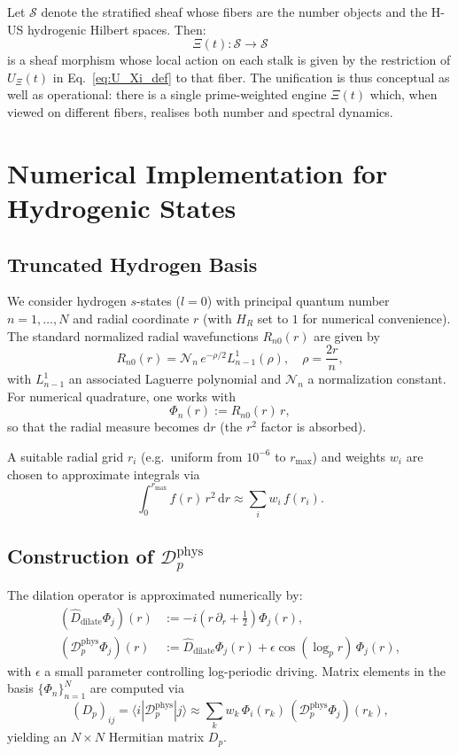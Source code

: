 \documentclass[11pt]{article}
\begin{document}
Let $\mathcal{S}$ denote the stratified sheaf whose fibers are the
number objects and the H-US hydrogenic Hilbert spaces. Then:
\[
  \Xi(t) : \mathcal{S} \longrightarrow \mathcal{S}
\]
is a sheaf morphism whose local action on each stalk is given by the
restriction of $U_\Xi(t)$ in Eq.~\eqref{eq:U_Xi_def} to that fiber.
The unification is thus conceptual as well as operational: there is a
single prime-weighted engine $\Xi(t)$ which, when viewed on different
fibers, realises both number and spectral dynamics.

\section{Numerical Implementation for Hydrogenic States}

\subsection{Truncated Hydrogen Basis}

We consider hydrogen $s$-states ($l=0$) with principal quantum number
$n=1,\dots,N$ and radial coordinate $r$ (with $H_R$ set to $1$ for
numerical convenience). The standard normalized radial wavefunctions
$R_{n0}(r)$ are given by
\[
  R_{n0}(r)
    = \mathcal{N}_n\,e^{-\rho/2} L_{n-1}^{1}(\rho),
  \quad \rho = \frac{2r}{n},
\]
with $L_{n-1}^{1}$ an associated Laguerre polynomial and
$\mathcal{N}_n$ a normalization constant. For numerical quadrature,
one works with
\[
  \Phi_n(r) := R_{n0}(r)\,r,
\]
so that the radial measure becomes $\mathrm{d}r$ (the $r^2$ factor is
absorbed).

A suitable radial grid $r_i$ (e.g.\ uniform from $10^{-6}$ to $r_{\max}$)
and weights $w_i$ are chosen to approximate integrals via
\[
  \int_0^{r_{\max}} f(r)\,r^2\,\mathrm{d}r
    \approx \sum_i w_i\,f(r_i).
\]

\subsection{Construction of \texorpdfstring{$\mathcal{D}^{\text{phys}}_p$}{}}

The dilation operator is approximated numerically by:
\begin{align*}
  \left(\hat D_{\text{dilate}} \Phi_j\right)(r)
    &:= -i\left(r\,\partial_r + \tfrac12\right)\Phi_j(r),\\
  \left(\mathcal{D}^{\text{phys}}_p \Phi_j\right)(r)
    &:= \hat D_{\text{dilate}}\Phi_j(r) + \epsilon \cos(\log_p r)\,\Phi_j(r),
\end{align*}
with $\epsilon$ a small parameter controlling log-periodic driving.
Matrix elements in the basis $\{\Phi_n\}_{n=1}^N$ are computed via
\[
  (D_p)_{ij}
    = \langle i | \mathcal{D}^{\text{phys}}_p | j \rangle
    \approx \sum_k w_k\,\Phi_i(r_k)\,
        \left(\mathcal{D}^{\text{phys}}_p\Phi_j\right)(r_k),
\]
yielding an $N\times N$ Hermitian matrix $D_p$.
\end{document}
